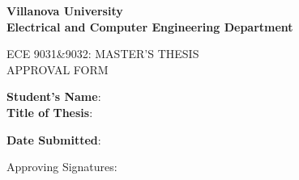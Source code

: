 


\begin{center}
\bfseries
Villanova University\\
Electrical and Computer Engineering Department

\vspace{1cm}

\uppercase{ECE 9031\&9032: Master's Thesis\\ Approval Form}
\end{center}

\vspace*{0.30cm} 
\noindent \textbf{Student's Name}: \underline{} \\ %
  
\vspace{1cm}
\noindent
\noindent \textbf{ Title of Thesis}: \underline{} \ 

\vspace{1cm}
\noindent
\noindent \textbf{Date Submitted}: \underline{} \ 


\vspace{1cm}
\noindent Approving Signatures:\\
\vspace{.5in}



